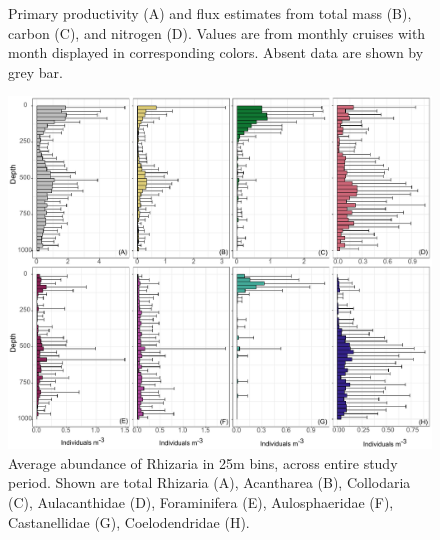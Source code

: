 \documentclass[
]{article}
\begin{document}
\begin{figure}
{}

\caption{Primary productivity (A) and flux estimates from total mass
(B), carbon (C), and nitrogen (D). Values are from monthly cruises with
month displayed in corresponding colors. Absent data are shown by grey
bar.}

\end{figure}

\newpage

\begin{figure}

{\centering \includegraphics{images/04_vertical.pdf}

}

\caption{Average abundance of Rhizaria in 25m bins, across entire study
period. Shown are total Rhizaria (A), Acantharea (B), Collodaria (C),
Aulacanthidae (D), Foraminifera (E), Aulosphaeridae (F), Castanellidae
(G), Coelodendridae (H).}

\end{figure}

\newpage
\end{document}

